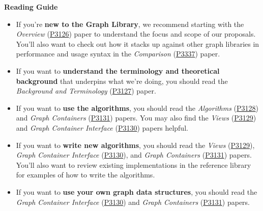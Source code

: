 \textbf{Reading Guide} 
\begin{itemize}
  \item If you're \textbf{new to the Graph Library}, we recommend starting with the \textit{Overview} (\href{https://www.wg21.link/P3126}{P3126}) paper to understand the focus and scope of our proposals.
        You'll also want to check out how it stacks up against other graph libraries in performance and usage syntax in the \textit{Comparison} (\href{https://www.wg21.link/P3337}{P3337}) paper.
  \item If you want to \textbf{understand the terminology and theoretical background} that underpins what we're doing, you should read the \textit{Background and Terminology} (\href{https://www.wg21.link/P3127}{P3127}) paper.
  \item If you want to \textbf{use the algorithms}, you should read the \textit{Algorithms} (\href{https://www.wg21.link/P3128}{P3128}) and \textit{Graph Containers} (\href{https://www.wg21.link/P3131}{P3131}) papers.
        You may also find the \textit{Views} (\href{https://www.wg21.link/P3129}{P3129}) and \textit{Graph Container Interface} (\href{https://www.wg21.link/P3130}{P3130}) papers helpful. 
  \item If you want to \textbf{write new algorithms}, you should read the \textit{Views} (\href{https://www.wg21.link/P3129}{P3129}), \textit{Graph Container Interface} (\href{https://www.wg21.link/P3130}{P3130}), and \textit{Graph Containers} (\href{https://www.wg21.link/P3131}{P3131}) papers.
        You'll also want to review existing implementations in the reference library for examples of how to write the algorithms.
  \item If you want to \textbf{use your own graph data structures}, you should read the \textit{Graph Container Interface} (\href{https://www.wg21.link/P3130}{P3130}) and \textit{Graph Containers} (\href{https://www.wg21.link/P3131}{P3131}) papers.
\end{itemize}

  
%
